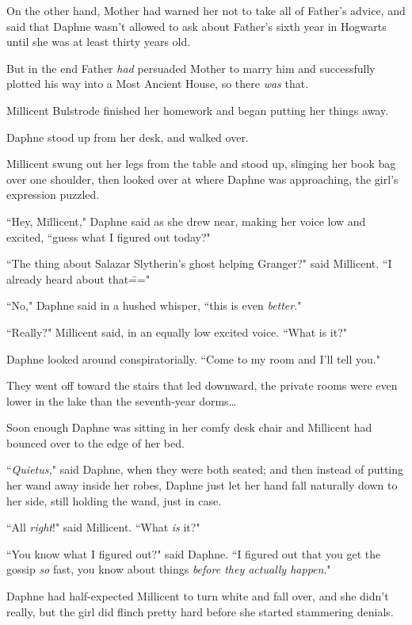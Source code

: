 On the other hand, Mother had warned her not to take all of Father's advice, and said that Daphne wasn't allowed to ask about Father's sixth year in Hogwarts until she was at least thirty years old.

But in the end Father \emph{had} persuaded Mother to marry him and successfully plotted his way into a Most Ancient House, so there \emph{was} that.

Millicent Bulstrode finished her homework and began putting her things away.

Daphne stood up from her desk, and walked over.

Millicent swung out her legs from the table and stood up, slinging her book bag over one shoulder, then looked over at where Daphne was approaching, the girl's expression puzzled.

``Hey, Millicent," Daphne said as she drew near, making her voice low and excited, ``guess what I figured out today?"

``The thing about Salazar Slytherin's ghost helping Granger?" said Millicent. ``I already heard about that\==="

``No," Daphne said in a hushed whisper, ``this is even \emph{better}."

``Really?" Millicent said, in an equally low excited voice. ``What is it?"

Daphne looked around conspiratorially. ``Come to my room and I'll tell you."

They went off toward the stairs that led downward, the private rooms were even lower in the lake than the seventh-year dorms{\ldots}

Soon enough Daphne was sitting in her comfy desk chair and Millicent had bounced over to the edge of her bed.

``\emph{Quietus,}" said Daphne, when they were both seated; and then instead of putting her wand away inside her robes, Daphne just let her hand fall naturally down to her side, still holding the wand, just in case.

``All \emph{right}!" said Millicent. ``What \emph{is} it?"

``You know what I figured out?" said Daphne. ``I figured out that you get the gossip \emph{so} fast, you know about things \emph{before they actually happen}."

Daphne had half-expected Millicent to turn white and fall over, and she didn't really, but the girl did flinch pretty hard before she started stammering denials.

